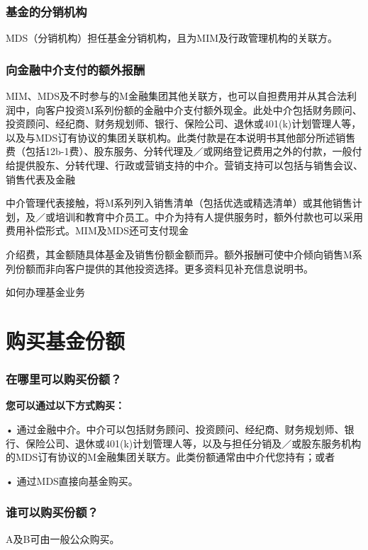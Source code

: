 \documentclass[UTF8,fontset=none,11pt,a4paper]{ctexart}
\begin{document}
\subsubsection*{基金的分销机构}
MDS（分销机构）担任基金分销机构，且为MIM及行政管理机构的关联方。

\subsubsection*{向金融中介支付的额外报酬}
MIM、MDS及不时参与的M金融集团其他关联方，也可以自担费用并从其合法利润中，向客户投资M系列份额的金融中介支付额外现金。此处中介包括财务顾问、投资顾问、经纪商、财务规划师、银行、保险公司、退休或401(k)计划管理人等，以及与MDS订有协议的集团关联机构。此类付款是在本说明书其他部分所述销售费（包括12b-1费）、股东服务、分转代理及／或网络登记费用之外的付款，一般付给提供股东、分转代理、行政或营销支持的中介。营销支持可以包括与销售会议、销售代表及金融


\par{}\label{originalpage7}
中介管理代表接触，将M系列列入销售清单（包括优选或精选清单）或其他销售计划，及／或培训和教育中介员工。中介为持有人提供服务时，额外付款也可以采用费用补偿形式。MIM及MDS还可支付现金

介绍费，其金额随具体基金及销售份额金额而异。额外报酬可使中介倾向销售M系列份额而非向客户提供的其他投资选择。更多资料见补充信息说明书。


\par{}\label{originalpage8}
如何办理基金业务

\label{unitU312}\section*{购买基金份额}\label{unitU313}
\subsubsection*{在哪里可以购买份额？}
\textbf{您可以通过以下方式购买：}

\noindent • 通过金融中介。中介可以包括财务顾问、投资顾问、经纪商、财务规划师、银行、保险公司、退休或401(k)计划管理人等，以及与担任分销及／或股东服务机构的MDS订有协议的M金融集团关联方。此类份额通常由中介代您持有；或者\par\smallskip
\noindent • 通过MDS直接向基金购买。\par\smallskip
\subsubsection*{谁可以购买份额？}
A及B可由一般公众购买。
\end{document}
